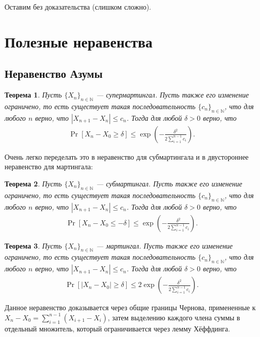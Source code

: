 \documentclass[12pt]{article}
\newcommand\N{\mathbb{N}}
\newtheorem{theorem}{Теорема}
\begin{document}
Оставим без доказательства (слишком сложно).

\section{Полезные неравенства}

\subsection{Неравенство Азумы}
\begin{theorem}
  Пусть $\{X_n\}_{n \in \N}$ --- супермартингал. Пусть также его изменение ограничено, то есть существует такая последовательность $\{c_n\}_{n \in \N}$, что для любого $n$ верно, что $|X_{n + 1} - X_n| \le c_n$. Тогда для любой $\delta > 0$ верно, что
  \begin{align*}
    \Pr[X_n - X_0 \ge \delta] \le \exp\left(-\frac{\delta^2}{2 \sum_{i = 1}^{n - 1}c_i}\right).
  \end{align*}
\end{theorem}

Очень легко переделать это в неравенство для субмартингала и в двустороннее неравенство для мартингала:

\begin{theorem}
  Пусть $\{X_n\}_{n \in \N}$ --- субмартингал. Пусть также его изменение ограничено, то есть существует такая последовательность $\{c_n\}_{n \in \N}$, что для любого $n$ верно, что $|X_{n + 1} - X_n| \le c_n$. Тогда для любой $\delta > 0$ верно, что
  \begin{align*}
    \Pr[X_n - X_0 \le -\delta] \le \exp\left(-\frac{\delta^2}{2 \sum_{i = 1}^{n - 1}c_i}\right).
  \end{align*}
\end{theorem}

\begin{theorem}
  Пусть $\{X_n\}_{n \in \N}$ --- мартингал. Пусть также его изменение ограничено, то есть существует такая последовательность $\{c_n\}_{n \in \N}$, что для любого $n$ верно, что $|X_{n + 1} - X_n| \le c_n$. Тогда для любой $\delta > 0$ верно, что
  \begin{align*}
    \Pr[|X_n - X_0| \ge \delta] \le 2\exp\left(-\frac{\delta^2}{2 \sum_{i = 1}^{n - 1}c_i}\right).
  \end{align*}
\end{theorem}

Данное неравенство доказывается через общие границы Чернова, примененные к $X_n - X_0 = \sum_{i = 1}^{n - 1} (X_{i + 1} - X_i)$, затем выделению каждого члена суммы в отдельный множитель, который ограничивается через лемму Хёффдинга. 
\end{document}
